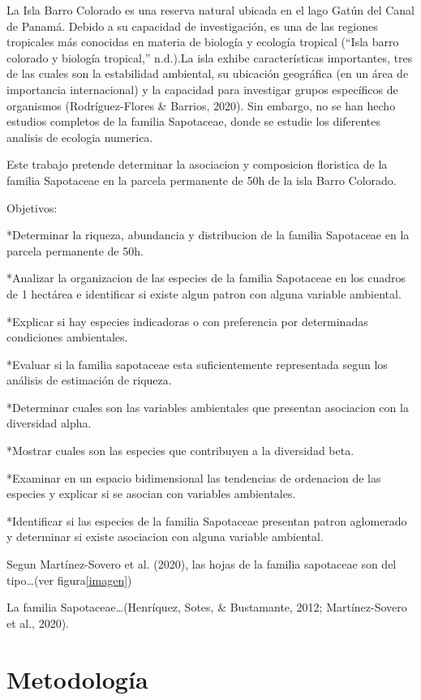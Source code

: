 \documentclass[11pt,]{article}
\begin{document}
La Isla Barro Colorado es una reserva natural ubicada en el lago Gatún
del Canal de Panamá. Debido a su capacidad de investigación, es una de
las regiones tropicales más conocidas en materia de biología y ecología
tropical (``Isla barro colorado y biología tropical,'' n.d.).La isla
exhibe características importantes, tres de las cuales son la
estabilidad ambiental, su ubicación geográfica (en un área de
importancia internacional) y la capacidad para investigar grupos
específicos de organismos (Rodríguez-Flores \& Barrios, 2020). Sin
embargo, no se han hecho estudios completos de la familia Sapotaceae,
donde se estudie los diferentes analisis de ecologia numerica.

Este trabajo pretende determinar la asociacion y composicion floristica
de la familia Sapotaceae en la parcela permanente de 50h de la isla
Barro Colorado.

Objetivos:

*Determinar la riqueza, abundancia y distribucion de la familia
Sapotaceae en la parcela permanente de 50h.

*Analizar la organizacion de las especies de la familia Sapotaceae en
los cuadros de 1 hectárea e identificar si existe algun patron con
alguna variable ambiental.

*Explicar si hay especies indicadoras o con preferencia por determinadas
condiciones ambientales.

*Evaluar si la familia sapotaceae esta suficientemente representada
segun los análisis de estimación de riqueza.

*Determinar cuales son las variables ambientales que presentan
asociacion con la diversidad alpha.

*Mostrar cuales son las especies que contribuyen a la diversidad beta.

*Examinar en un espacio bidimensional las tendencias de ordenacion de
las especies y explicar si se asocian con variables ambientales.

*Identificar si las especies de la familia Sapotaceae presentan patron
aglomerado y determinar si existe asociacion con alguna variable
ambiental.

Segun Martínez-Sovero et al. (2020), las hojas de la familia sapotaceae
son del tipo\ldots{}(ver figura\ref{imagen})

La familia Sapotaceae\ldots{}(Henríquez, Sotes, \& Bustamante, 2012;
Martínez-Sovero et al., 2020).

\section{Metodología}\label{metodologuxeda}
\end{document}

